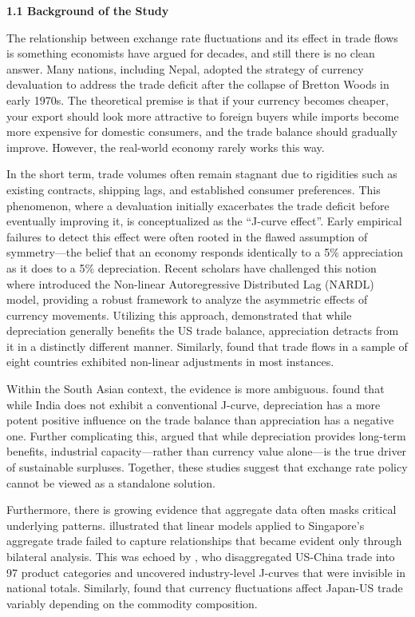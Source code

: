 \documentclass[12pt]{article}
\begin{document}
\noindent\textbf{1.1 Background of the Study}

The relationship between exchange rate fluctuations and its effect in trade flows is something economists have argued for decades, and still there is no clean answer. Many nations, including Nepal, adopted the strategy of currency devaluation to address the trade deficit after the collapse of Bretton Woods in early 1970s. The theoretical premise is that if your currency becomes cheaper, your export should look more attractive to foreign buyers while imports become more expensive for domestic consumers, and the trade balance should gradually improve. However, the real-world economy rarely works this way.

In the short term, trade volumes often remain stagnant due to rigidities such as existing contracts, shipping lags, and established consumer preferences. This phenomenon, where a devaluation initially exacerbates the trade deficit before eventually improving it, is conceptualized as the ``J-curve effect''. Early empirical failures to detect this effect were often rooted in the flawed assumption of symmetry—the belief that an economy responds identically to a 5\% appreciation as it does to a 5\% depreciation. Recent scholars have challenged this notion where \textcite{Shin2014-ap} introduced the Non-linear Autoregressive Distributed Lag (NARDL) model, providing a robust framework to analyze the asymmetric effects of currency movements. Utilizing this approach, \textcite{Nasir2021-xt} demonstrated that while depreciation generally benefits the US trade balance, appreciation detracts from it in a distinctly different manner. Similarly, \textcite{Arize2017-ar} found that trade flows in a sample of eight countries exhibited non-linear adjustments in most instances.

Within the South Asian context, the evidence is more ambiguous. \textcite{Bhat2021-ux} found that while India does not exhibit a conventional J-curve, depreciation has a more potent positive influence on the trade balance than appreciation has a negative one. Further complicating this, \textcite{Ganai2025-bv} argued that while depreciation provides long-term benefits, industrial capacity—rather than currency value alone—is the true driver of sustainable surpluses. Together, these studies suggest that exchange rate policy cannot be viewed as a standalone solution.

Furthermore, there is growing evidence that aggregate data often masks critical underlying patterns. \textcite{Bahmani-Oskooee2017-cf} illustrated that linear models applied to Singapore’s aggregate trade failed to capture relationships that became evident only through bilateral analysis. This was echoed by \textcite{Bahmani-Oskooee2019-ha}, who disaggregated US-China trade into 97 product categories and uncovered industry-level J-curves that were invisible in national totals. Similarly, \textcite{Bahmani-Oskooee2018-ij} found that currency fluctuations affect Japan-US trade variably depending on the commodity composition.
\end{document}

